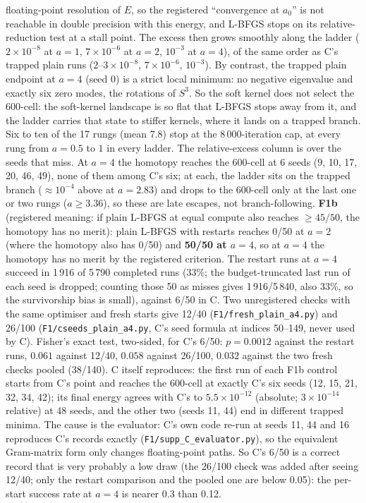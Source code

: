 floating-point resolution of $E$, so the registered ``convergence at $a_0$'' is not reachable in double precision with this
energy, and L-BFGS stops on its relative-reduction test at a stall point. The excess then grows smoothly along the ladder
($2\times10^{-8}$ at $a=1$, $7\times10^{-6}$ at $a=2$, $10^{-3}$ at $a=4$), of the same order as C's trapped plain runs
($2$--$3\times10^{-8}$, $7\times10^{-6}$, $10^{-3}$). By contrast, the trapped plain endpoint at $a=4$ (seed 0) is a strict local
minimum: no negative eigenvalue and exactly six zero modes, the rotations of $S^3$. So the soft kernel does not select the
600-cell: the soft-kernel landscape is so flat that L-BFGS stops away from it, and the ladder carries that state to stiffer
kernels, where it lands on a trapped branch. Six to ten of the 17 rungs (mean 7.8) stop at the 8\,000-iteration cap, at every
rung from $a=0.5$ to $1$ in every ladder. The relative-excess column is over the seeds that miss. At $a=4$ the homotopy
reaches the 600-cell at 6 seeds (9, 10, 17, 20, 46, 49), none of them among C's six; at each, the ladder sits on the trapped
branch ($\approx10^{-4}$ above at $a=2.83$) and drops to the 600-cell only at the last one or two rungs ($a\ge3.36$), so these are
late escapes, not branch-following. \textbf{F1b} (registered meaning: if plain L-BFGS at equal compute also reaches $\ge45/50$,
the homotopy has no merit): plain L-BFGS with restarts reaches 0/50 at $a=2$ (where the homotopy also has 0/50) and
\textbf{50/50 at $a=4$}, so at $a=4$ the homotopy has no merit by the registered criterion. The restart runs at $a=4$ succeed in
1\,916 of 5\,790 completed runs (33\%; the budget-truncated last run of each seed is dropped; counting those 50 as misses gives 1\,916/5\,840, also 33\%, so the survivorship bias is small),
against 6/50 in C. Two unregistered checks with the same optimiser and fresh starts give 12/40 (\texttt{F1/fresh\_plain\_a4.py})
and 26/100 (\texttt{F1/cseeds\_plain\_a4.py}, C's seed formula at indices 50--149, never used by C). Fisher's exact test,
two-sided, for C's 6/50: $p=0.0012$ against the restart runs, $0.061$ against 12/40, $0.058$ against 26/100, $0.032$ against
the two fresh checks pooled (38/140). C itself reproduces: the first run of each F1b control starts from C's point and reaches
the 600-cell at exactly C's six seeds (12, 15, 21, 32, 34, 42); its final energy agrees with C's to $5.5\times10^{-12}$ (absolute; $3\times10^{-14}$ relative)
at 48 seeds, and the other two (seeds 11, 44) end in different trapped minima. The cause is the evaluator: C's own code re-run at
seeds 11, 44 and 16 reproduces C's records exactly (\texttt{F1/supp\_C\_evaluator.py}), so the equivalent Gram-matrix form only
changes floating-point paths. So C's 6/50 is a correct record that is very probably a low draw (the 26/100 check was added after
seeing 12/40; only the restart comparison and the pooled one are below 0.05): the per-start success rate at $a=4$ is nearer 0.3
than 0.12.

